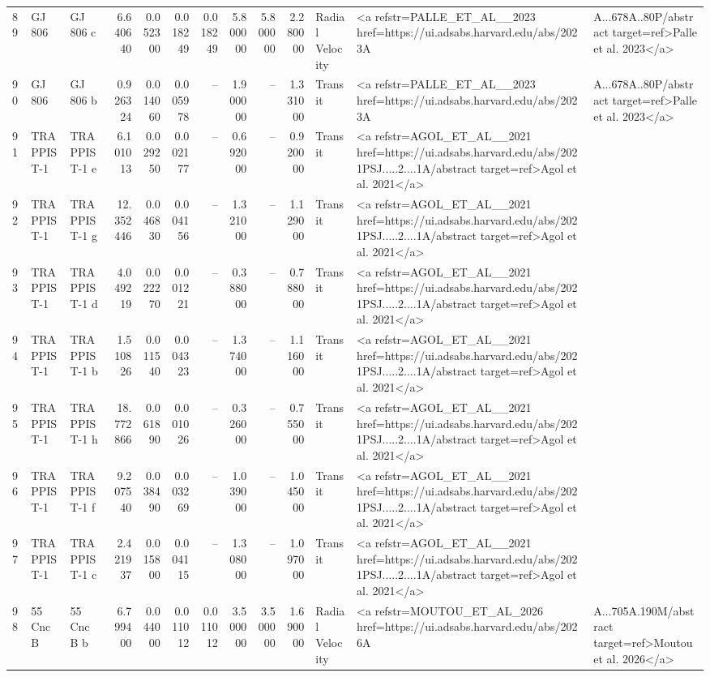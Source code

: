 \begin{tabular}{lllrrrrrrrll}
89 & GJ 806 & GJ 806 c & 6.640640 & 0.052300 & 0.018249 & 0.018249 & 5.800000 & 5.800000 & 2.280000 & Radial Velocity & <a refstr=PALLE_ET_AL__2023 href=https://ui.adsabs.harvard.edu/abs/2023A&A...678A..80P/abstract target=ref>Palle et al. 2023</a> \\
90 & GJ 806 & GJ 806 b & 0.926324 & 0.014060 & 0.005978 & -- & 1.900000 & -- & 1.331000 & Transit & <a refstr=PALLE_ET_AL__2023 href=https://ui.adsabs.harvard.edu/abs/2023A&A...678A..80P/abstract target=ref>Palle et al. 2023</a> \\
91 & TRAPPIST-1 & TRAPPIST-1 e & 6.101013 & 0.029250 & 0.002177 & -- & 0.692000 & -- & 0.920000 & Transit & <a refstr=AGOL_ET_AL__2021 href=https://ui.adsabs.harvard.edu/abs/2021PSJ.....2....1A/abstract target=ref>Agol et al. 2021</a> \\
92 & TRAPPIST-1 & TRAPPIST-1 g & 12.352446 & 0.046830 & 0.004156 & -- & 1.321000 & -- & 1.129000 & Transit & <a refstr=AGOL_ET_AL__2021 href=https://ui.adsabs.harvard.edu/abs/2021PSJ.....2....1A/abstract target=ref>Agol et al. 2021</a> \\
93 & TRAPPIST-1 & TRAPPIST-1 d & 4.049219 & 0.022270 & 0.001221 & -- & 0.388000 & -- & 0.788000 & Transit & <a refstr=AGOL_ET_AL__2021 href=https://ui.adsabs.harvard.edu/abs/2021PSJ.....2....1A/abstract target=ref>Agol et al. 2021</a> \\
94 & TRAPPIST-1 & TRAPPIST-1 b & 1.510826 & 0.011540 & 0.004323 & -- & 1.374000 & -- & 1.116000 & Transit & <a refstr=AGOL_ET_AL__2021 href=https://ui.adsabs.harvard.edu/abs/2021PSJ.....2....1A/abstract target=ref>Agol et al. 2021</a> \\
95 & TRAPPIST-1 & TRAPPIST-1 h & 18.772866 & 0.061890 & 0.001026 & -- & 0.326000 & -- & 0.755000 & Transit & <a refstr=AGOL_ET_AL__2021 href=https://ui.adsabs.harvard.edu/abs/2021PSJ.....2....1A/abstract target=ref>Agol et al. 2021</a> \\
96 & TRAPPIST-1 & TRAPPIST-1 f & 9.207540 & 0.038490 & 0.003269 & -- & 1.039000 & -- & 1.045000 & Transit & <a refstr=AGOL_ET_AL__2021 href=https://ui.adsabs.harvard.edu/abs/2021PSJ.....2....1A/abstract target=ref>Agol et al. 2021</a> \\
97 & TRAPPIST-1 & TRAPPIST-1 c & 2.421937 & 0.015800 & 0.004115 & -- & 1.308000 & -- & 1.097000 & Transit & <a refstr=AGOL_ET_AL__2021 href=https://ui.adsabs.harvard.edu/abs/2021PSJ.....2....1A/abstract target=ref>Agol et al. 2021</a> \\
98 & 55 Cnc B & 55 Cnc B b & 6.799400 & 0.044000 & 0.011012 & 0.011012 & 3.500000 & 3.500000 & 1.690000 & Radial Velocity & <a refstr=MOUTOU_ET_AL_2026 href=https://ui.adsabs.harvard.edu/abs/2026A&A...705A.190M/abstract target=ref>Moutou et al. 2026</a> \\

\end{tabular}
